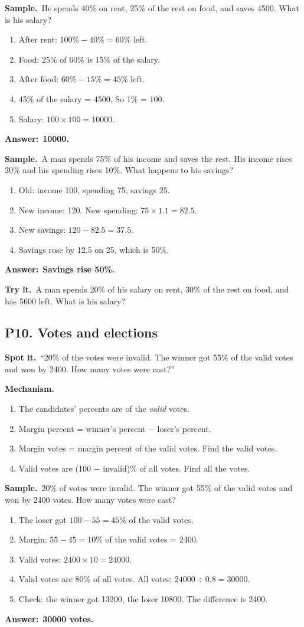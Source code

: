 \documentclass[11pt,a4paper]{article}
\let\oldsubsection\subsection
\renewcommand{\subsection}{\needspace{9\baselineskip}\oldsubsection}
\newcommand{\spot}{\textbf{\color{ember}Spot it.}\ }
\newcommand{\mech}{\textbf{\color{ember}Mechanism.}\ }
\newif\ifkeepsamp
\newcommand{\ans}[1]{\par\nopagebreak\noindent\textbf{\color{ember}Answer:}\ \textbf{#1}\par}
\newcommand{\samp}{\ifkeepsamp\needspace{4\baselineskip}\fi\textbf{\color{ember}Sample.}\ }
\newcommand{\tryit}[1]{\textbf{\color{ember}Try it.}\ #1}
\begin{document}
\samp He spends 40\% on rent, 25\% of the rest on food, and saves 4500. What is his salary?
\begin{enumerate}
\item After rent: $100\% - 40\% = 60\%$ left.
\item Food: 25\% of 60\% is 15\% of the salary.
\item After food: $60\% - 15\% = 45\%$ left.
\item 45\% of the salary = 4500. So 1\% = 100.
\item Salary: $100 \times 100 = 10000$.
\end{enumerate}
\ans{10000.}

\samp A man spends 75\% of his income and saves the rest. His income rises 20\% and his spending rises 10\%. What happens to his savings?
\begin{enumerate}
\item Old: income 100, spending 75, savings 25.
\item New income: 120. New spending: $75 \times 1.1 = 82.5$.
\item New savings: $120 - 82.5 = 37.5$.
\item Savings rose by 12.5 on 25, which is 50\%.
\end{enumerate}
\ans{Savings rise 50\%.}

\tryit A man spends 20\% of his salary on rent, 30\% of the rest on food, and has 5600 left. What is his salary?

\subsection{P10. Votes and elections}
\spot ``20\% of the votes were invalid. The winner got 55\% of the valid votes and won by 2400. How many votes were cast?''

\mech
\begin{enumerate}
\item The candidates' percents are of the \emph{valid} votes.
\item Margin percent = winner's percent $-$ loser's percent.
\item Margin votes = margin percent of the valid votes. Find the valid votes.
\item Valid votes are (100 $-$ invalid)\% of all votes. Find all the votes.
\end{enumerate}

\samp 20\% of votes were invalid. The winner got 55\% of the valid votes and won by 2400 votes. How many votes were cast?
\begin{enumerate}
\item The loser got $100 - 55 = 45\%$ of the valid votes.
\item Margin: $55 - 45 = 10\%$ of the valid votes = 2400.
\item Valid votes: $2400 \times 10 = 24000$.
\item Valid votes are 80\% of all votes. All votes: $24000 \div 0.8 = 30000$.
\item Check: the winner got 13200, the loser 10800. The difference is 2400.
\end{enumerate}
\ans{30000 votes.}
\end{document}
